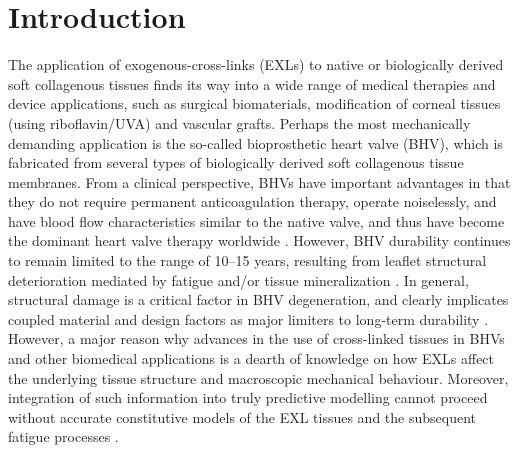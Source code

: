 \section{Introduction}

    The application of exogenous-cross-links (EXLs) to native or biologically derived soft collagenous tissues finds its way into a wide range of medical therapies and device applications, such as surgical biomaterials, modification of corneal tissues (using riboflavin/UVA) and vascular grafts. Perhaps the most mechanically demanding application is the so-called bioprosthetic heart valve (BHV), which is fabricated from several types of biologically derived soft collagenous tissue membranes. From a clinical perspective, BHVs have important advantages in that they do not require permanent anticoagulation therapy, operate noiselessly, and have blood flow characteristics similar to the native valve, and thus have become the dominant heart valve therapy worldwide \cite{bini_noncollagenous_1999,schoen_cardiac_2005,schoen_founders_1999}. However, BHV durability continues to remain limited to the range of 10–15 years, resulting from leaflet structural deterioration mediated by fatigue and/or tissue mineralization \cite{vesely_tissue_2001,sacks_calcification_1999}. In general, structural damage is a critical factor in BHV degeneration, and clearly implicates coupled material and design factors as major limiters to long-term durability \cite{schoen_calcification_2005,schoen_pathology_2001}. However, a major reason why advances in the use of cross-linked tissues in BHVs and other biomedical applications is a dearth of knowledge on how EXLs affect the underlying tissue structure and macroscopic mechanical behaviour. Moreover, integration of such information into truly predictive modelling cannot proceed without accurate constitutive models of the EXL tissues and the subsequent fatigue processes \cite{sacks_incorporation_2003,sun_finite_2005}.


